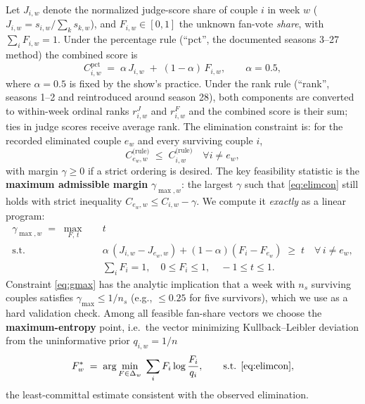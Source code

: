 \documentclass[11pt]{article}
\begin{document}
Let $J_{i,w}$ denote the normalized judge-score share of couple $i$ in week $w$
($J_{i,w} = s_{i,w}/\sum_k s_{k,w}$), and $F_{i,w} \in [0,1]$ the unknown fan-vote
\emph{share}, with $\sum_i F_{i,w} = 1$. Under the percentage rule (``pct'', the
documented seasons 3--27 method) the combined score is
\begin{equation}
  C^{\text{pct}}_{i,w} \;=\; \alpha\, J_{i,w} \;+\; (1-\alpha)\, F_{i,w},
  \qquad \alpha = 0.5, \label{eq:pct}
\end{equation}
where $\alpha = 0.5$ is fixed by the show's practice. Under the rank rule (``rank'',
seasons 1--2 and reintroduced around season 28), both components are converted to
within-week ordinal ranks $r^J_{i,w}$ and $r^F_{i,w}$ and the combined score is their
sum; ties in judge scores receive average rank. The elimination constraint is: for the
recorded eliminated couple $e_w$ and every surviving couple $i$,
\begin{equation}
  C^{\text{(rule)}}_{e_w,w} \;\le\; C^{\text{(rule)}}_{i,w} \quad \forall i \neq e_w,
  \label{eq:elimcon}
\end{equation}
with margin $\gamma \ge 0$ if a strict ordering is desired. The key feasibility
statistic is the \textbf{maximum admissible margin} $\gamma_{\max,w}$: the largest
$\gamma$ such that \eqref{eq:elimcon} still holds with strict inequality
$C_{e_w,w} \le C_{i,w} - \gamma$. We compute it \emph{exactly} as a linear program:
\begin{equation}
\begin{aligned}
  \gamma_{\max,w} \;=\; \max_{\,F,\,t}\quad & t \\
  \text{s.t.}\;\; & \alpha\,(J_{i,w} - J_{e_w,w}) + (1-\alpha)(F_i - F_{e_w}) \;\ge\;
  t \quad \forall\, i \neq e_w,\\
  & \textstyle\sum_i F_i = 1,\quad 0 \le F_i \le 1,\quad -1 \le t \le 1 .
\end{aligned}
\label{eq:gmax}
\end{equation}
Constraint \eqref{eq:gmax} has the analytic implication that a week with $n_s$ surviving
couples satisfies $\gamma_{\max} \le 1/n_s$ (e.g., $\le 0.25$ for five survivors), which
we use as a hard validation check. Among all feasible fan-share vectors we choose the
\textbf{maximum-entropy} point, i.e.\ the vector minimizing Kullback--Leibler deviation
from the uninformative prior $q_{i,w} = 1/n$
\begin{equation}
  F^*_w \;=\; \arg\min_{F \in \Delta_w} \;\sum_{i} F_i \log \frac{F_i}{q_i},
  \qquad \text{s.t. } \eqref{eq:elimcon},
  \label{eq:maxent}
\end{equation}
the least-committal estimate consistent with the observed elimination.
\end{document}
